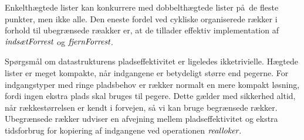 Enkelthægtede lister kan konkurrere med dobbelthægtede lister på de fleste punkter, men ikke alle.
Den eneste fordel ved cykliske organiserede rækker i forhold til ubegrænsede ræakker er, at de tillader effektiv implementation af $\operatorname{\emph{indsætForrest}}$ og $\operatorname{\emph{fjernForrest}}$.

Spørgsmål om datastrukturens pladseffektivitet er ligeledes ikketrivielle.
Hægtede lister er meget kompakte, når indgangene er betydeligt større end pegerne.
For indgangstyper med ringe pladsbehov er rækker normalt en mere kompakt løsning, fordi ingen ekstra plads skal bruges til pegere.
Dette gælder med sikkerhed altid, når rækkestørrelsen er kendt i forvejen, så vi kan bruge begrænsede rækker.
Ubegrænsede rækker udviser en afvejning mellem pladseffektivitet og ekstra tidsforbrug for kopiering af indgangene ved operationen $\operatorname{\emph{realloker}}$. 









